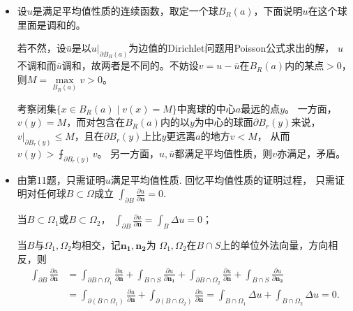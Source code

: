 \begin{itemize}
    （2）设$x$关于$\{x_{n-1}=0\}$的对称点是$\tilde{x}$，
    $x,\tilde{x}$关于$\{x_n=0\}$的对称点是$x^*,\tilde{x}^*$，Green函数为
    $$G(x,y)=\varGamma(x-y)-\varGamma(\tilde{x}-y)-\varGamma(x^*-y)+\varGamma(\tilde{x}^*-y).$$

    \item[11.] 设$u$是满足平均值性质的连续函数，取定一个球$B_R(a)$，下面说明$u$在这个球里面是调和的。

    若不然，设$\bar{u}$是以$u|_{\partial B_R(a)}$为边值的Dirichlet问题用Poisson公式求出的解，
    $u$不调和而$\bar{u}$调和，故两者是不同的。不妨设$v=u-\bar{u}$在$B_R(a)$内的某点$>0$，则$M=\max\limits_{B_R(a)}v>0$。

    考察闭集$\{x \in B_R(a) \mid v(x)=M\}$中离球的中心$a$最远的点$y$。
    一方面，$v(y)=M$，而对包含在$B_R(a)$内的以$y$为中心的球面$\partial B_r(y)$来说，
    $v|_{\partial B_r(y)} \leqslant M$，且在$\partial B_r(y)$上比$y$更远离$a$的地方$v<M$，
    从而$v(y)>\intbar_{\!\partial B_r(y)}v$。
    另一方面，$u,\bar{u}$都满足平均值性质，则$v$亦满足，矛盾。

    \item[14.] 由第11题，只需证明$u$满足平均值性质. 回忆平均值性质的证明过程，
    只需证明对任何球$B\subset\varOmega$成立
    $\displaystyle{\int_{\partial B}\frac{\partial u}{\partial\boldsymbol{n}}=0}$.

    当$B\subset\varOmega_1$或$B\subset\varOmega_2$，
    $\displaystyle{\int_{\partial B}\frac{\partial u}{\partial\boldsymbol{n}}=\int_B\Delta u=0}$；

    当$B$与$\varOmega_1,\varOmega_2$均相交，记$\boldsymbol{n_1},\boldsymbol{n_2}$为
    $\varOmega_1,\varOmega_2$在$B\cap S$上的单位外法向量，方向相反，则
    \begin{align*}\int_{\partial B}\frac{\partial u}{\partial\boldsymbol{n}}
    &=\int_{\partial B\cap\varOmega_1}\frac{\partial u}{\partial\boldsymbol{n}}
    +\int_{B\cap S}\frac{\partial u}{\partial\boldsymbol{n_1}}
    +\int_{\partial B\cap\varOmega_2}\frac{\partial u}{\partial\boldsymbol{n}}
    +\int_{B\cap S}\frac{\partial u}{\partial\boldsymbol{n_2}}\\
    &=\int_{\partial(B\cap\varOmega_1)}\frac{\partial u}{\partial\boldsymbol{n}}
    +\int_{\partial(B\cap\varOmega_2)}\frac{\partial u}{\partial\boldsymbol{n}}
    =\int_{B\cap\varOmega_1}\Delta u+\int_{B\cap\varOmega_2}\Delta u=0.\end{align*}
\end{itemize}

